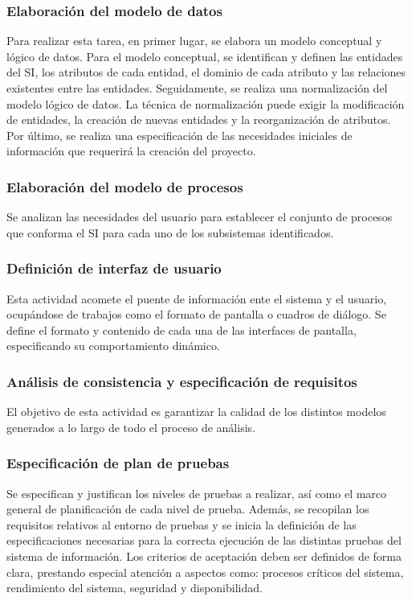 \documentclass[11pt,a4paper,spanish,twoside]{book}
\begin{document}
\subsubsection{Elaboración del modelo de datos}
Para realizar esta tarea, en primer lugar, se elabora un modelo conceptual y 
lógico de datos. Para el modelo conceptual, se identifican y definen las 
entidades del SI, los atributos de cada entidad, el dominio de cada atributo y 
las relaciones existentes entre las entidades. Seguidamente, se realiza una 
normalización del modelo lógico de datos. La técnica de normalización puede 
exigir la modificación de entidades, la creación de nuevas entidades y la 
reorganización de atributos. Por último, se realiza una especificación de las 
necesidades iniciales de información que requerirá la creación del proyecto.

\subsubsection{Elaboración del modelo de procesos}
Se analizan las necesidades del usuario para establecer el conjunto de procesos
que conforma el SI para cada uno de los subsistemas identificados.

\subsubsection{Definición de interfaz de usuario}
Esta actividad acomete el puente de información ente el sistema y el usuario, 
ocupándose de trabajos como el formato de pantalla o cuadros de diálogo. Se 
define el formato y contenido de cada una de las interfaces de pantalla, 
especificando su comportamiento dinámico.

\subsubsection{Análisis de consistencia y especificación de requisitos}
El objetivo de esta actividad es garantizar la calidad de los distintos modelos
generados a lo largo de todo el proceso de análisis.

\subsubsection{Especificación de plan de pruebas}
Se especifican y justifican los niveles de pruebas a realizar, así como el 
marco general de planificación de cada nivel de prueba. Además, se recopilan 
los requisitos relativos al entorno de pruebas y se inicia la definición de las
especificaciones necesarias para la correcta ejecución de las distintas
pruebas del sistema de información. Los criterios de aceptación deben
ser definidos de forma clara, prestando especial atención a aspectos como:
procesos críticos del sistema, rendimiento del sistema, seguridad y 
disponibilidad.
\end{document}
